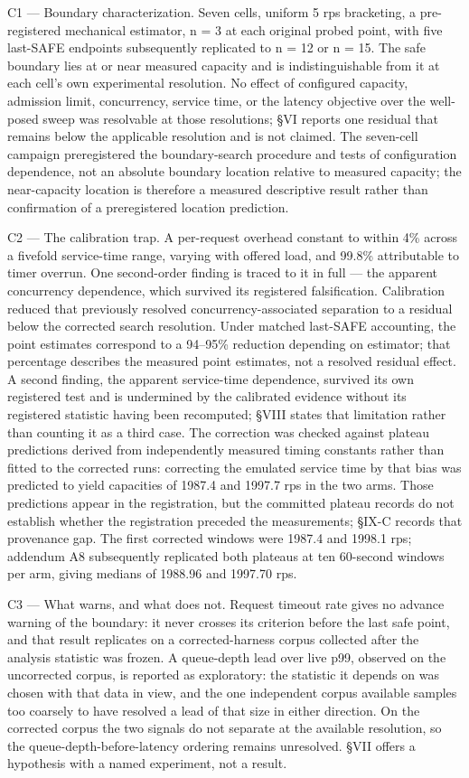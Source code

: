 \documentclass{ieeeaccess}
\begin{document}
C1 --- Boundary characterization. Seven cells, uniform 5 rps bracketing, a pre-registered mechanical estimator, n = 3 at each original probed point, with five last-SAFE endpoints subsequently replicated to n = 12 or n = 15. The safe boundary lies at or near measured capacity and is indistinguishable from it at each cell's own experimental resolution. No effect of configured capacity, admission limit, concurrency, service time, or the latency objective over the well-posed sweep was resolvable at those resolutions; \S{}VI reports one residual that remains below the applicable resolution and is not claimed. The seven-cell campaign preregistered the boundary-search procedure and tests of configuration dependence, not an absolute boundary location relative to measured capacity; the near-capacity location is therefore a measured descriptive result rather than confirmation of a preregistered location prediction.

C2 --- The calibration trap. A per-request overhead constant to within 4\% across a fivefold service-time range, varying with offered load, and 99.8\% attributable to timer overrun. One second-order finding is traced to it in full --- the apparent concurrency dependence, which survived its registered falsification. Calibration reduced that previously resolved concurrency-associated separation to a residual below the corrected search resolution. Under matched last-SAFE accounting, the point estimates correspond to a 94--95\% reduction depending on estimator; that percentage describes the measured point estimates, not a resolved residual effect. A second finding, the apparent service-time dependence, survived its own registered test and is undermined by the calibrated evidence without its registered statistic having been recomputed; \S{}VIII states that limitation rather than counting it as a third case. The correction was checked against plateau predictions derived from independently measured timing constants rather than fitted to the corrected runs: correcting the emulated service time by that bias was predicted to yield capacities of 1987.4 and 1997.7 rps in the two arms. Those predictions appear in the registration, but the committed plateau records do not establish whether the registration preceded the measurements; \S{}IX-C records that provenance gap. The first corrected windows were 1987.4 and 1998.1 rps; addendum A8 subsequently replicated both plateaus at ten 60-second windows per arm, giving medians of 1988.96 and 1997.70 rps.

C3 --- What warns, and what does not. Request timeout rate gives no advance warning of the boundary: it never crosses its criterion before the last safe point, and that result replicates on a corrected-harness corpus collected after the analysis statistic was frozen. A queue-depth lead over live p99, observed on the uncorrected corpus, is reported as exploratory: the statistic it depends on was chosen with that data in view, and the one independent corpus available samples too coarsely to have resolved a lead of that size in either direction. On the corrected corpus the two signals do not separate at the available resolution, so the queue-depth-before-latency ordering remains unresolved. \S{}VII offers a hypothesis with a named experiment, not a result.
\end{document}
